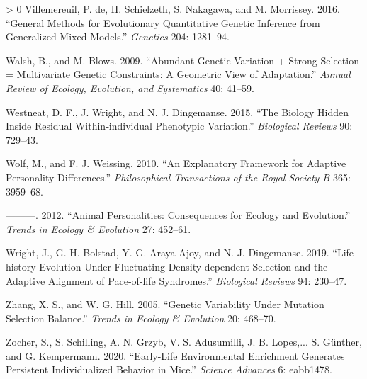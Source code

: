\documentclass{article}
\newlength{\cslhangindent}
\newenvironment{CSLReferences}[3] %
 {%
  \setlength{\parindent}{0pt}
  \ifodd #1 \everypar{\setlength{\hangindent}{\cslhangindent}}\ignorespaces\fi
  \ifnum #2 > 0
  \setlength{\parskip}{#2\baselineskip}
  \fi
 }%
 {}
\begin{document}
\begin{CSLReferences}{1}{0}
\leavevmode\hypertarget{ref-Vill2016}{}%
Villemereuil, P. de, H. Schielzeth, S. Nakagawa, and M. Morrissey. 2016.
{``General Methods for Evolutionary Quantitative Genetic Inference from
Generalized Mixed Models.''} \emph{Genetics} 204: 1281--94.

\leavevmode\hypertarget{ref-Walsh2009}{}%
Walsh, B., and M. Blows. 2009. {``Abundant Genetic Variation + Strong
Selection = Multivariate Genetic Constraints: A Geometric View of
Adaptation.''} \emph{Annual Review of Ecology, Evolution, and
Systematics} 40: 41--59.

\leavevmode\hypertarget{ref-Westneat2015}{}%
Westneat, D. F., J. Wright, and N. J. Dingemanse. 2015. {``The Biology
Hidden Inside Residual Within‐individual Phenotypic Variation.''}
\emph{Biological Reviews} 90: 729--43.

\leavevmode\hypertarget{ref-Wolf2010}{}%
Wolf, M., and F. J. Weissing. 2010. {``An Explanatory Framework for
Adaptive Personality Differences.''} \emph{Philosophical Transactions of
the Royal Society B} 365: 3959--68.

\leavevmode\hypertarget{ref-Wolf2012}{}%
---------. 2012. {``Animal Personalities: Consequences for Ecology and
Evolution.''} \emph{Trends in Ecology \& Evolution} 27: 452--61.

\leavevmode\hypertarget{ref-Wright2019}{}%
Wright, J., G. H. Bolstad, Y. G. Araya‐Ajoy, and N. J. Dingemanse. 2019.
{``Life‐history Evolution Under Fluctuating Density‐dependent Selection
and the Adaptive Alignment of Pace‐of‐life Syndromes.''}
\emph{Biological Reviews} 94: 230--47.

\leavevmode\hypertarget{ref-Zhang2005}{}%
Zhang, X. S., and W. G. Hill. 2005. {``Genetic Variability Under
Mutation Selection Balance.''} \emph{Trends in Ecology \& Evolution} 20:
468--70.

\leavevmode\hypertarget{ref-Zocher2020}{}%
Zocher, S., S. Schilling, A. N. Grzyb, V. S. Adusumilli, J. B. Lopes,...
S. Günther, and G. Kempermann. 2020. {``Early-Life Environmental
Enrichment Generates Persistent Individualized Behavior in Mice.''}
\emph{Science Advances} 6: eabb1478.

\end{CSLReferences}



\end{document}
